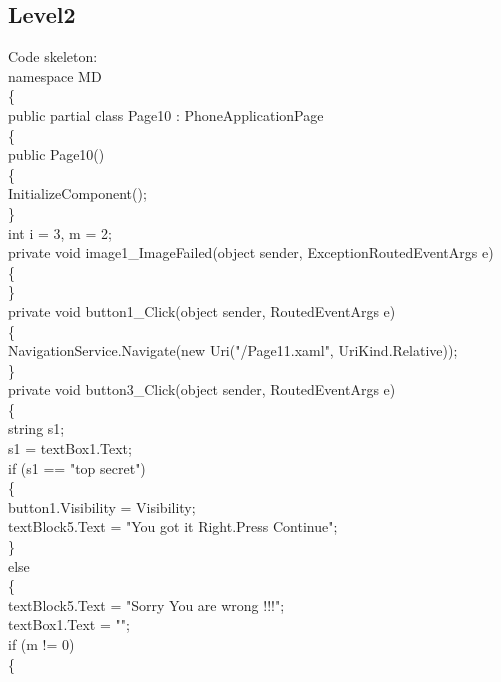 {{\rmfamily



\subsection{Level2}
\ttfamily \hspace{1cm}
\rmfamily
Code skeleton:\\
namespace MD\\
\{\\
    public partial class Page10 : PhoneApplicationPage\\
    \{\\
        public Page10()\\
        \{\\
            InitializeComponent();\\
        \}\\
        int i = 3, m = 2;\\
        private void image1_ImageFailed(object sender, ExceptionRoutedEventArgs e)\\
        \{\\
            
        \}\\
        private void button1_Click(object sender, RoutedEventArgs e)\\
        \{\\
            NavigationService.Navigate(new Uri("/Page11.xaml", UriKind.Relative));\\
        \}\\

        private void button3_Click(object sender, RoutedEventArgs e)\\
        \{\\
            string s1;\\
            s1 = textBox1.Text;\\
            if (s1 == "top secret")\\
            \{\\
                button1.Visibility = Visibility;\\
                textBlock5.Text = "You got it Right.Press Continue";\\
            \}\\
            else\\
            \{\\                textBlock5.Text = "Sorry You are wrong !!!";\\
                textBox1.Text = "";\\
                if (m != 0)\\
                \{\\

}}
